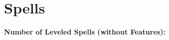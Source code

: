 \documentclass[letterpaper,openany,oneside,twocolumn]{book}
\begin{document}
%    
%	
%    
%    

\vfill\eject
\section*{Spells}
\textbf{Number of Leveled Spells (without Features):} 
\end{document}
